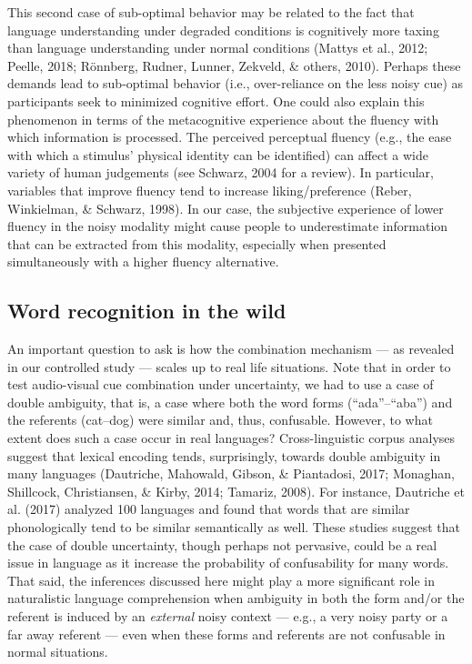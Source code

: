 \documentclass[english,,man,floatsintext]{apa6}
\theoremstyle{definition}
\theoremstyle{definition}
\theoremstyle{definition}
\theoremstyle{remark}
\begin{document}
This second case of sub-optimal behavior may be related to the fact that
language understanding under degraded conditions is cognitively more
taxing than language understanding under normal conditions (Mattys et
al., 2012; Peelle, 2018; Rönnberg, Rudner, Lunner, Zekveld, \& others,
2010). Perhaps these demands lead to sub-optimal behavior (i.e.,
over-reliance on the less noisy cue) as participants seek to minimized
cognitive effort. One could also explain this phenomenon in terms of the
metacognitive experience about the fluency with which information is
processed. The perceived perceptual fluency (e.g., the ease with which a
stimulus' physical identity can be identified) can affect a wide variety
of human judgements (see Schwarz, 2004 for a review). In particular,
variables that improve fluency tend to increase liking/preference
(Reber, Winkielman, \& Schwarz, 1998). In our case, the subjective
experience of lower fluency in the noisy modality might cause people to
underestimate information that can be extracted from this modality,
especially when presented simultaneously with a higher fluency
alternative.

\subsection{Word recognition in the
wild}\label{word-recognition-in-the-wild}

An important question to ask is how the combination mechanism --- as
revealed in our controlled study --- scales up to real life situations.
Note that in order to test audio-visual cue combination under
uncertainty, we had to use a case of double ambiguity, that is, a case
where both the word forms (\enquote{ada}--\enquote{aba}) and the
referents (cat--dog) were similar and, thus, confusable. However, to
what extent does such a case occur in real languages? Cross-linguistic
corpus analyses suggest that lexical encoding tends, surprisingly,
towards double ambiguity in many languages (Dautriche, Mahowald, Gibson,
\& Piantadosi, 2017; Monaghan, Shillcock, Christiansen, \& Kirby, 2014;
Tamariz, 2008). For instance, Dautriche et al. (2017) analyzed 100
languages and found that words that are similar phonologically tend to
be similar semantically as well. These studies suggest that the case of
double uncertainty, though perhaps not pervasive, could be a real issue
in language as it increase the probability of confusability for many
words. That said, the inferences discussed here might play a more
significant role in naturalistic language comprehension when ambiguity
in both the form and/or the referent is induced by an \emph{external}
noisy context --- e.g., a very noisy party or a far away referent ---
even when these forms and referents are not confusable in normal
situations.
\end{document}
